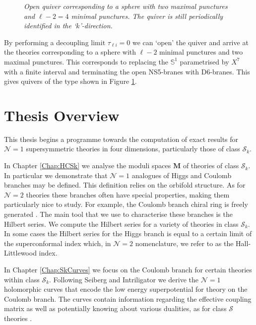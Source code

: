 \documentclass[main.tex]{subfiles}
\begin{document}
\begin{figure}
  \caption{\it Open quiver corresponding to a sphere with two maximal punctures and $\ell-2=4$ minimal punctures.  The quiver is still periodically identified in the `$k$'-direction.}
  \label{fig:Skquivergenus0}
\end{figure}
\newline
By performing a decoupling limit $\tau_{\ell i}=0$ we can `open' the quiver and arrive at the theories corresponding to a sphere with $\ell-2$ minimal punctures and two maximal punctures.  This corresponds to replacing the $\mathbb{S}^1$ parametrised by $X^7$ with a finite interval and terminating the open NS5-branes with D$6$-branes.  This gives quivers of the type shown in Figure \ref{fig:Skquivergenus0}.
\section{Thesis Overview}
This thesis begins a programme towards the computation of exact results for $\mathcal{N}=1$ supersymmetric theories in four dimensions, particularly those of class $\mathcal{S}_k$.  

In Chapter \ref{Chap:HCSk} we analyse the moduli spaces $\mathbf{M}$ of theories of class $\mathcal{S}_k$.  In particular we demonstrate that $\mathcal{N}=1$ analogues of Higgs and Coulomb branches may be defined.  This definition relies on the orbifold structure.  As for $\mathcal{N}=2$ theories these branches often have special properties, making them particularly nice to study.  For example, the Coulomb branch chiral ring is freely generated \cite{Razamat:2018zus}.  The main tool that we use to characterise these branches is the Hilbert series.  We compute the Hilbert series for a variety of theories in class $\mathcal{S}_k$.  In some cases the Hilbert series for the Higgs branch is equal to a certain limit of the superconformal index which, in $\mathcal{N}=2$ nomenclature, we refer to as the Hall-Littlewood index.

In Chapter \ref{Chap:SkCurves} we focus on the Coulomb branch for certain theories within class $\mathcal{S}_k$. Following Seiberg and Intriligator \cite{Intriligator:1994sm} we derive the $\mathcal{N}=1$ holomorphic curves that encode the low energy superpotential for theory on the Coulomb branch. The curves contain information regarding the effective coupling matrix as well as potentially knowing about various dualities, as for class $\mathcal{S}$ theories \cite{Gaiotto:2009we}. 
\end{document}
